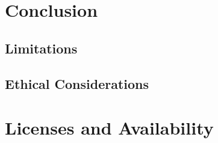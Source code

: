 \documentclass[conference]{IEEEtran}
\newif\ifcameraready
\newcommand{\camerareadyonly}[1]{\ifcameraready #1\fi}
\begin{document}
\section{Conclusion}\label{sec:conclusion}


\subsection{Limitations}


\subsection{Ethical Considerations}


\section*{Licenses and Availability}


\camerareadyonly{%
\section*{Author Contributions}

\section*{Acknowledgment}

}




% 
\end{document}
